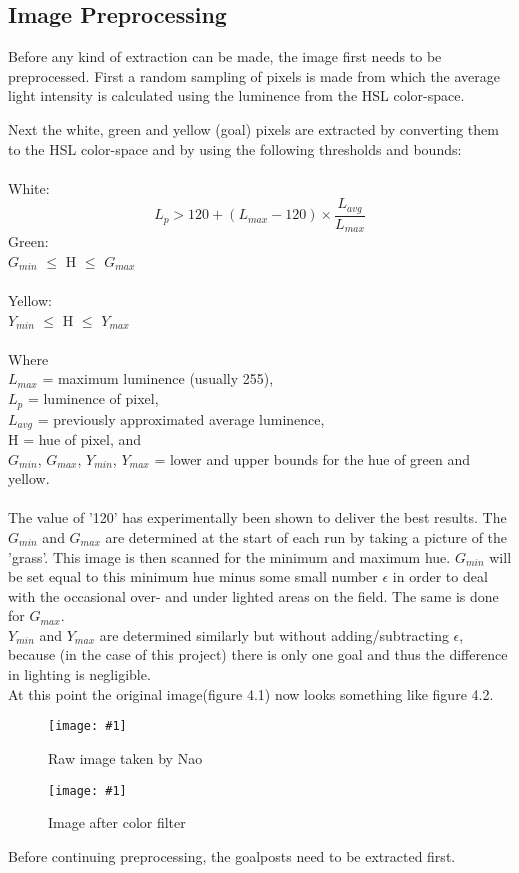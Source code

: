 \documentclass{ba-kecs}
\numberwithin{figure}{section}
\numberwithin{equation}{section}
\newcommand{\dkepic}[2]{ %
	\begin{figure}[H] %
	\texttt{[image: \#1]}
	\caption{#2}
	\label{#1}
	\end{figure}
}
\begin{document}
\subsection{Image Preprocessing}
Before any kind of extraction can be made, the image first needs to be preprocessed. First a random sampling of pixels is made from which the average light intensity is calculated using the luminence from the HSL color-space.

Next the white, green and yellow (goal) pixels are extracted by converting them to the HSL color-space and by using the following thresholds and bounds:\\ \\
White:
\[ L_{p} > 120 + (L_{max}-120) \times \frac{L_{avg}}{L_{max}} \]
Green:\\ $G_{min}$ $\leq$ H $\leq$ $G_{max}$\\ \\
Yellow:\\ $Y_{min}$ $\leq$ H $\leq$ $Y_{max}$\\ \\
Where \\
$L_{max}$ = maximum luminence (usually 255),\\
$L_{p}$ = luminence of pixel, \\
$L_{avg}$ = previously approximated average luminence, \\
H = hue of pixel, and \\
$G_{min}$, $G_{max}$, $Y_{min}$, $Y_{max}$ = lower and upper bounds for the hue of green and yellow.\\ \\
The value of '120' has experimentally been shown to deliver the best results. The $G_{min}$ and $G_{max}$ are determined at the start of each run by taking a picture of the 'grass'. This image is then scanned for the minimum and maximum hue. $G_{min}$ will be set equal to this minimum hue minus some small number $\epsilon$ in order to deal with the occasional over- and under lighted areas on the field. The same is done for $G_{max}$.\\
$Y_{min}$ and $Y_{max}$ are determined similarly but without adding/subtracting $\epsilon$, because (in the case of this project) there is only one goal and thus the difference in lighting is negligible.\\
At this point the original image(figure 4.1) now looks something like figure 4.2.\\
\dkepic{figure_IP1}{Raw image taken by Nao}
\dkepic{figure_IP2}{Image after color filter}
Before continuing preprocessing, the goalposts need to be extracted first.
\end{document}
